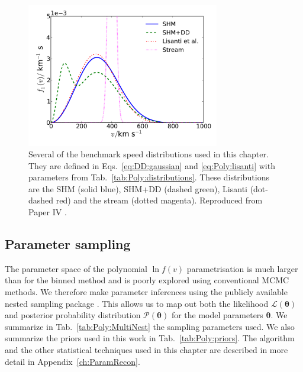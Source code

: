 \begin{figure}[t]
\centering
  \includegraphics[width=0.75\textwidth]{Poly/SpeedDistributions-Ensemble.pdf}
  \caption[Several benchmark speed distributions used to test the polynomial $\ln f(v)$ method.]{Several of the benchmark speed distributions used in this chapter. They are defined in Eqs.~\ref{eq:DD:gaussian} and \ref{eq:Poly:lisanti} with parameters from Tab.~\ref{tab:Poly:distributions}. These distributions are the SHM (solid blue), SHM+DD (dashed green), Lisanti \etal (dot-dashed red) and the stream (dotted magenta). Reproduced from Paper IV \cite{Kavanagh:2014}.}
  \label{fig:Poly:Ensemble_distributions}
\end{figure}


\subsection{Parameter sampling}
\label{sec:Poly:ParamRecon}
The parameter space of the polynomial $\ln f(v)$ parametrisation is much larger than for the binned method and is poorly explored using conventional MCMC methods. We therefore make parameter inferences using the publicly available \multinest nested sampling package \cite{Feroz:2007,Feroz:2008,Feroz:2014}. This allows us to map out both the likelihood $\mathcal{L}(\mathbf{\theta})$ and posterior probability distribution $\mathcal{P}(\mathbf{\theta})$ for the model parameters $\mathbf{\theta}$. We summarize in Tab.~\ref{tab:Poly:MultiNest} the \multinest sampling parameters used. We also summarize the priors used in this work in Tab.~\ref{tab:Poly:priors}. The \multinest algorithm and the other statistical techniques used in this chapter are described in more detail in Appendix~\ref{ch:ParamRecon}.



